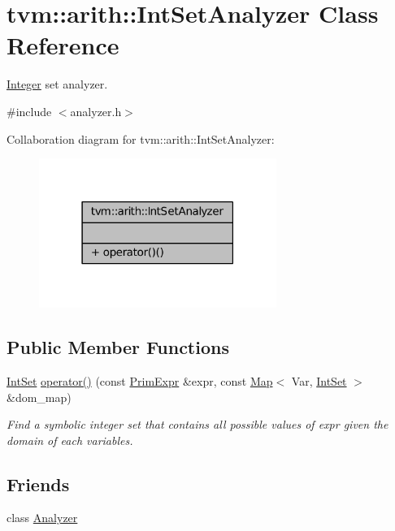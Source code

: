\hypertarget{classtvm_1_1arith_1_1IntSetAnalyzer}{}\section{tvm\+:\+:arith\+:\+:Int\+Set\+Analyzer Class Reference}
\label{classtvm_1_1arith_1_1IntSetAnalyzer}


\hyperlink{classtvm_1_1Integer}{Integer} set analyzer.  




{\ttfamily \#include $<$analyzer.\+h$>$}



Collaboration diagram for tvm\+:\+:arith\+:\+:Int\+Set\+Analyzer\+:
\nopagebreak
\begin{figure}[H]
\begin{center}
\leavevmode
\includegraphics[width=219pt]{classtvm_1_1arith_1_1IntSetAnalyzer__coll__graph}
\end{center}
\end{figure}
\subsection*{Public Member Functions}
\begin{DoxyCompactItemize}
\item 
\hyperlink{classtvm_1_1arith_1_1IntSet}{Int\+Set} \hyperlink{classtvm_1_1arith_1_1IntSetAnalyzer_ac8784f523d61adffbded801b17d4c2bf}{operator()} (const \hyperlink{classtvm_1_1PrimExpr}{Prim\+Expr} \&expr, const \hyperlink{classtvm_1_1Map}{Map}$<$ Var, \hyperlink{classtvm_1_1arith_1_1IntSet}{Int\+Set} $>$ \&dom\+\_\+map)
\begin{DoxyCompactList}\small\item\em Find a symbolic integer set that contains all possible values of expr given the domain of each variables. \end{DoxyCompactList}\end{DoxyCompactItemize}
\subsection*{Friends}
\begin{DoxyCompactItemize}
\item 
class \hyperlink{classtvm_1_1arith_1_1IntSetAnalyzer_a88d594816df596eed10643082b0d0805}{Analyzer}
\end{DoxyCompactItemize}


